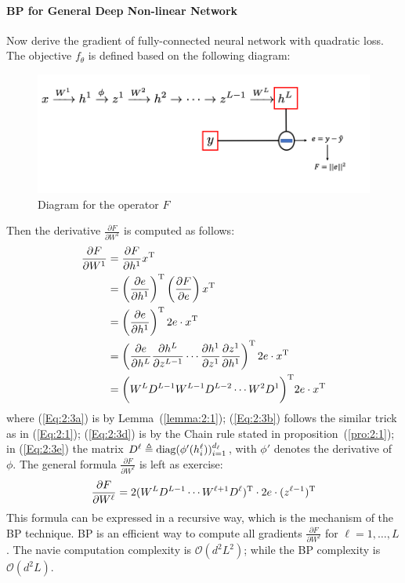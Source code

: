 \paragraph{BP for General Deep Non-linear Network}
Now derive the gradient of fully-connected neural network with quadratic loss. 
The objective $f_\theta$ is defined based on the following diagram:
\begin{figure}[H]
\centering
\includegraphics[width=\textwidth]{Second_lecture/p_4}
\caption{Diagram for the operator $F$}
\end{figure}
Then the derivative $\frac{\partial F}{\partial W^1}$ is computed as follows:
\begin{subequations}
\begin{align}
\frac{\partial F}{\partial W^1} &= \frac{\partial F}{\partial h^1}x^{\mathrm T}\label{Eq:2:3a}\\
&=\left(\frac{\partial e}{\partial h^1}\right)^{\mathrm T}\left(\frac{\partial F}{\partial e}\right)x^{\mathrm T}\label{Eq:2:3b}\\
&=\left(\frac{\partial e}{\partial h^1}\right)^{\mathrm T} 2e\cdot x^{\mathrm T}\nonumber\\
&=\left(
\frac{\partial e}{\partial h^L}\frac{\partial h^L}{\partial z^{L-1}}\cdots\frac{\partial h^1}{\partial z^1}\frac{\partial z^1}{\partial h^1}
\right)^{\mathrm T}2e\cdot x^{\mathrm T}\label{Eq:2:3d}\\
&=\bigg(W^LD^{L-1}W^{L-1}D^{L-2}\cdots W^2D^1\bigg)^{\mathrm T}2e\cdot x^{\mathrm T}\label{Eq:2:3e}
\end{align}
\end{subequations}
where (\ref{Eq:2:3a}) is by Lemma~(\ref{lemma:2:1});
(\ref{Eq:2:3b}) follows the similar trick as in (\ref{Eq:2:1});
(\ref{Eq:2:3d}) is by the Chain rule stated in proposition~(\ref{pro:2:1});
in (\ref{Eq:2:3e}) the matrix $D^{\ell}\triangleq\operatorname{diag}(\phi'(h_i^{\ell}))_{i=1}^{d_{\ell}}$, with $\phi'$ denotes the derivative of $\phi$.
The general formula $\frac{\partial F}{\partial W^{\ell}}$ is left as exercise: 
\[
\frac{\partial F}{\partial W^{\ell}}=
2(W^{L}D^{L-1}\cdots W^{\ell+1}D^{\ell})^{\mathrm T}\cdot 2e\cdot(z^{\ell-1})^{\mathrm T}
\]
This formula can be expressed in a recursive way, which is the mechanism of the BP technique.  
BP is an efficient way to compute all gradients $\frac{\partial F}{\partial W^{\ell}}$ for $\ell=1,\dots,L$.
The navie computation complexity is $\mathcal{O}(d^2L^2)$; while the BP complexity is $\mathcal{O}(d^2L)$.


